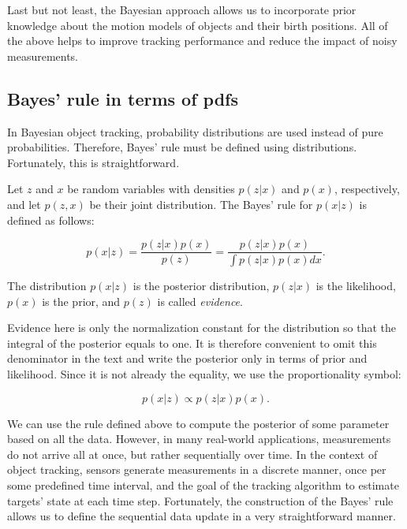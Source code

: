 Last but not least, the Bayesian approach allows us to incorporate prior 
knowledge about the motion models of objects and their birth positions. All of 
the above helps to improve tracking performance and reduce the impact of noisy 
measurements.

\subsection{Bayes' rule in terms of pdfs}

In Bayesian object tracking, probability distributions are used instead of pure 
probabilities. Therefore, Bayes' rule must be defined using distributions. 
Fortunately, this is straightforward.

\begin{definition}
    Let $z$ and $x$ be random variables with densities $p(z | x)$ and $p(x)$, 
    respectively, and let $p(z, x)$ be their joint distribution. The Bayes' rule
    for 
    $p(x | z)$ is defined as follows:

    $$
    p(x | z)
        = \frac{p(z | x) p(x)}{p(z)}
        = \frac{p(z | x) p(x)}{\int p(z | x) p(x) dx}.
    $$
\end{definition}

The distribution $p(x | z)$ is the posterior distribution, $p(z | x)$ is the 
likelihood, $p(x)$ is the prior, and $p(z)$ is called \textit{evidence}.

Evidence here is only the normalization constant for the distribution so
that the integral of the posterior equals to one. It is therefore convenient
to omit this denominator in the text and write the posterior only in terms of
prior and likelihood. Since it is not already the equality, we use the
proportionality symbol:

$$
p(x | z) \propto p(z | x) p(x).
$$

We can use the rule defined above to compute the posterior of some parameter
based on all the data. However, in many real-world applications, measurements
do not arrive all at once, but rather sequentially over time. In the context of 
object tracking, sensors generate measurements in a discrete manner, once per
some predefined time interval, and the goal of the tracking algorithm to 
estimate targets' state at each time step. Fortunately, the construction of the
Bayes' rule allows us to define the sequential data update in a very 
straightforward manner.

